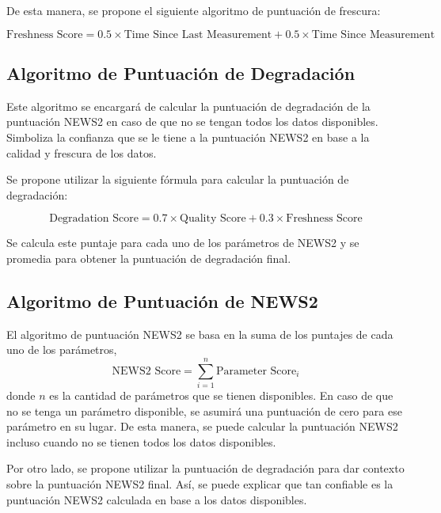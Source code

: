 De esta manera, se propone el siguiente algoritmo de puntuación de frescura:

\begin{equation}
    \text{Freshness Score} = 0.5 \times \text{Time Since Last Measurement} + 0.5 \times \text{Time Since Measurement}
\end{equation}

\subsection{Algoritmo de Puntuación de Degradación}

Este algoritmo se encargará de calcular la puntuación de degradación de la puntuación NEWS2 en caso de que no se tengan todos los datos disponibles.
Simboliza la confianza que se le tiene a la puntuación NEWS2 en base a la calidad y frescura de los datos.

Se propone utilizar la siguiente fórmula para calcular la puntuación de degradación:

\begin{equation}
    \text{Degradation Score} = 0.7 \times \text{Quality Score} + 0.3 \times \text{Freshness Score}
\end{equation}

Se calcula este puntaje para cada uno de los parámetros de NEWS2 y se promedia para obtener la puntuación de degradación final.

\subsection{Algoritmo de Puntuación de NEWS2}

El algoritmo de puntuación NEWS2 se basa en la suma de los puntajes de cada uno de los parámetros,
\begin{equation}
    \text{NEWS2 Score} = \sum_{i=1}^{n} \text{Parameter Score}_i
\end{equation}
donde $n$ es la cantidad de parámetros que se tienen disponibles.
En caso de que no se tenga un parámetro disponible, se asumirá una puntuación de cero para ese parámetro en su lugar.
De esta manera, se puede calcular la puntuación NEWS2 incluso cuando no se tienen todos los datos disponibles.

Por otro lado, se propone utilizar la puntuación de degradación para dar contexto sobre la puntuación NEWS2 final.
Así, se puede explicar que tan confiable es la puntuación NEWS2 calculada en base a los datos disponibles.

